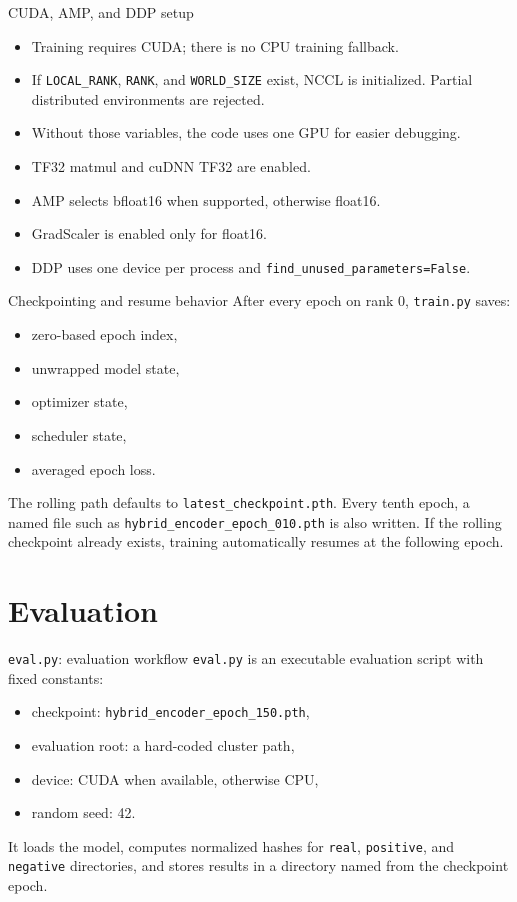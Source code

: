 \documentclass[aspectratio=169,10pt]{beamer}
\newcommand{\file}[1]{\texttt{#1}}
\newcommand{\code}[1]{\texttt{#1}}
\begin{document}
\begin{frame}{CUDA, AMP, and DDP setup}
  \begin{itemize}
    \item Training requires CUDA; there is no CPU training fallback.
    \item If \code{LOCAL\_RANK}, \code{RANK}, and \code{WORLD\_SIZE} exist,
          NCCL is initialized. Partial distributed environments are rejected.
    \item Without those variables, the code uses one GPU for easier debugging.
    \item TF32 matmul and cuDNN TF32 are enabled.
    \item AMP selects bfloat16 when supported, otherwise float16.
    \item GradScaler is enabled only for float16.
    \item DDP uses one device per process and \code{find\_unused\_parameters=False}.
  \end{itemize}
\end{frame}

\begin{frame}{Checkpointing and resume behavior}
  After every epoch on rank 0, \file{train.py} saves:
  \begin{itemize}
    \item zero-based epoch index,
    \item unwrapped model state,
    \item optimizer state,
    \item scheduler state,
    \item averaged epoch loss.
  \end{itemize}
  The rolling path defaults to \file{latest\_checkpoint.pth}. Every tenth epoch,
  a named file such as \file{hybrid\_encoder\_epoch\_010.pth} is also written.
  If the rolling checkpoint already exists, training automatically resumes at
  the following epoch.
\end{frame}

\section{Evaluation}

\begin{frame}{\file{eval.py}: evaluation workflow}
  \file{eval.py} is an executable evaluation script with fixed constants:
  \begin{itemize}
    \item checkpoint: \file{hybrid\_encoder\_epoch\_150.pth},
    \item evaluation root: a hard-coded cluster path,
    \item device: CUDA when available, otherwise CPU,
    \item random seed: 42.
  \end{itemize}
  It loads the model, computes normalized hashes for \file{real},
  \file{positive}, and \file{negative} directories, and stores results in a
  directory named from the checkpoint epoch.
\end{frame}
\end{document}
